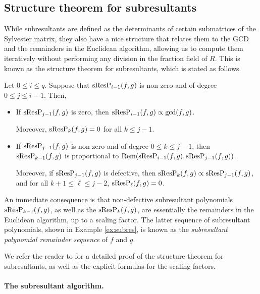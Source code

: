 \subsection{Structure theorem for subresultants}

While subresultants are defined as the determinants of certain submatrices of the Sylvester matrix, they also have a nice structure that relates them to the GCD and the remainders in the Euclidean algorithm, allowing us to compute them iteratively without performing any division in the fraction field of $R$. This is known as the structure theorem for subresultants, which is stated as follows.

\begin{theorem}
    Let $0\leq i\leq q$. Suppose that $\operatorname{sResP}_{i-1}(f,g)$ is non-zero and of degree $0\leq j\leq i-1$. Then,
    \begin{itemize}
        \item If $\operatorname{sResP}_{j-1}(f,g)$ is zero, then $\operatorname{sResP}_{i-1}(f,g)\propto\gcd(f,g)$.

              Moreover, $\operatorname{sResP}_{k}(f,g)=0$ for all $k\leq j-1$.

        \item If $\operatorname{sResP}_{j-1}(f,g)$ is non-zero and of degree $0\leq k\leq j-1$, then $\operatorname{sResP}_{k-1}(f,g)$ is proportional to $\operatorname{Rem}(\operatorname{sResP}_{i-1}(f,g),\operatorname{sResP}_{j-1}(f,g))$.

              Moreover, if $\operatorname{sResP}_{j-1}(f,g)$ is defective, then $\operatorname{sResP}_{k}(f,g)\propto\operatorname{sResP}_{j-1}(f,g)$, and for all $k+1\leq\ell\leq j-2$, $\operatorname{sResP}_{\ell}(f,g)=0$.
    \end{itemize}
\end{theorem}

An immediate consequence is that non-defective subresultant polynomials $\operatorname{sResP}_{k-1}(f,g)$, as well as the $\operatorname{sResP}_{k}(f,g)$, are essentially the remainders in the Euclidean algorithm, up to a scaling factor. The latter sequence of subresultant polynomials, shown in Example \ref{ex:subres}, is known as the \emph{subresultant polynomial remainder sequence} of $f$ and $g$.

We refer the reader to \cite[Chapter 8]{basu2006algorithms} for a detailed proof of the structure theorem for subresultants, as well as the explicit formulas for the scaling factors.

\paragraph{The subresultant algorithm.}

